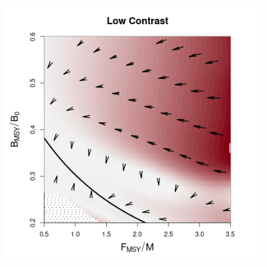 \begin{figure}[h!]
\begin{minipage}[h!]{0.44\textwidth}
\includegraphics[width=\textwidth]{../ddBias/directionalBiasDDSubFlatT45N150A0-1AS2K0.1N84EdgeReds 2.png}
\end{minipage}
\begin{minipage}[h!]{0.09\textwidth}
\hspace{-1cm}

\end{minipage}
\end{figure}
